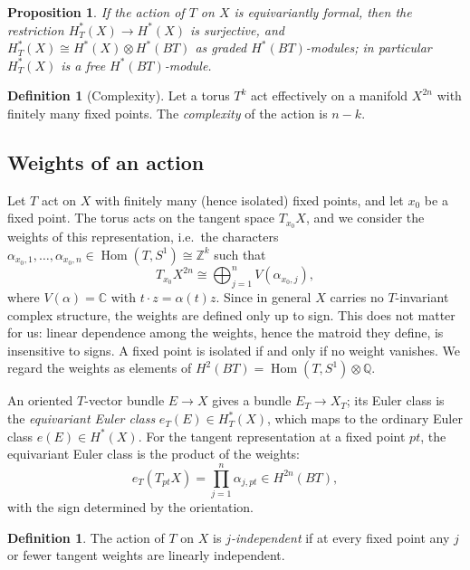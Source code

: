 \documentclass[11pt,a4paper]{article}
\numberwithin{equation}{section}
\theoremstyle{plain}
\newtheorem{proposition}[theorem]{Proposition}
\theoremstyle{definition}
\newtheorem{definition}[theorem]{Definition}
\theoremstyle{remark}
\newcommand{\Q}{\mathbb{Q}}
\newcommand{\C}{\mathbb{C}}
\newcommand{\Z}{\mathbb{Z}}
\newcommand{\HT}{H^{*}_{T}}
\DeclareMathOperator{\Hom}{Hom}
\begin{document}
\begin{proposition}\label{prop:formal}
If the action of $T$ on $X$ is equivariantly formal, then the restriction $\HT(X)\to H^*(X)$ is surjective, and $\HT(X)\cong H^*(X)\otimes H^*(BT)$ as graded $H^*(BT)$-modules; in particular $\HT(X)$ is a free $H^*(BT)$-module.
\end{proposition}

\begin{definition}[Complexity]\label{def:complexity}
Let a torus $T^k$ act effectively on a manifold $X^{2n}$ with finitely many fixed points. The \emph{complexity} of the action is $n-k$.
\end{definition}

\subsection{Weights of an action}

Let $T$ act on $X$ with finitely many (hence isolated) fixed points, and let $x_0$ be a fixed point. The torus acts on the tangent space $T_{x_0}X$, and we consider the weights of this representation, i.e.\ the characters $\alpha_{x_0,1},\dots,\alpha_{x_0,n}\in\Hom(T,S^1)\cong\Z^k$ such that
\begin{equation}\label{eq:tangent}
T_{x_0}X^{2n}\cong\bigoplus_{j=1}^nV(\alpha_{x_0,j}),
\end{equation}
where $V(\alpha)=\C$ with $t\cdot z=\alpha(t)z$. Since in general $X$ carries no $T$-invariant complex structure, the weights are defined only up to sign. This does not matter for us: linear dependence among the weights, hence the matroid they define, is insensitive to signs. A fixed point is isolated if and only if no weight vanishes. We regard the weights as elements of $H^2(BT)=\Hom(T,S^1)\otimes\Q$.

An oriented $T$-vector bundle $E\to X$ gives a bundle $E_T\to X_T$; its Euler class is the \emph{equivariant Euler class} $e_T(E)\in\HT(X)$, which maps to the ordinary Euler class $e(E)\in H^*(X)$. For the tangent representation at a fixed point $pt$, the equivariant Euler class is the product of the weights:
\[
e_T(T_{pt}X)=\prod_{j=1}^n\alpha_{j,pt}\in H^{2n}(BT),
\]
with the sign determined by the orientation.

\begin{definition}
The action of $T$ on $X$ is \emph{$j$-independent} if at every fixed point any $j$ or fewer tangent weights are linearly independent.
\end{definition}
\end{document}
